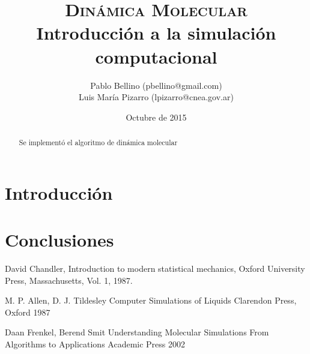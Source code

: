 \documentclass[a4paper,12pt]{article}
\title{\textsc{Dinámica Molecular} \\ \vspace{2em} \Large{Introducción a la 
simulación computacional}}
\author{\small{ Pablo Bellino (pbellino@gmail.com)} \\
        \small{Luis María Pizarro (lpizarro@cnea.gov.ar)}}
\date{Octubre de 2015}
\begin{document}

\maketitle

\begin{abstract}
Se implementó el algoritmo de dinámica molecular 
\end{abstract}


\section{Introducción}

\section{Conclusiones}

\begin{thebibliography}{9}

  David Chandler,
  Introduction to modern statistical mechanics,
  Oxford University Press, Massachusetts,
  Vol. 1,
  1987.

  M. P. Allen, D. J. Tildesley
  Computer Simulations of Liquids
  Clarendon Press, Oxford
  1987

  Daan Frenkel, Berend Smit
  Understanding Molecular Simulations From Algorithms to Applications
  Academic Press
  2002


\end{thebibliography}
\end{document}
